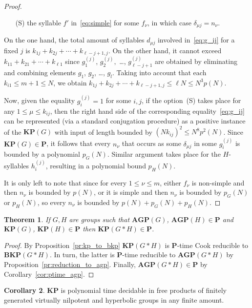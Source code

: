 \documentclass[10pt]{amsart}
\newtheorem{theorem}{Theorem}[section]
\theoremstyle{definition}
\newtheorem{corollary}[theorem]{Corollary}
\def\P{{\mathbf{P}}}
\def\BKP{{\mathbf{BKP}}}
\def\KP{{\mathbf{KP}}}
\def\AGP{{\mathbf{AGP}}}
\begin{document}
\begin{proof}
\begin{itemize}
\item[(S)]\label{li:simple} the syllable $f'$ in~\eqref{eq:simple} for some $f_\nu$, in which case $\delta_{\mu j}=n_\nu$.
\end{itemize}
On the one hand, the total amount of syllables $d_{\mu j}$ involved in~\eqref{eq:g_ij} for a fixed $j$ is $k_{1j}+k_{2j}+\cdots +k_{\ell-j+1,j}$. On the other hand, it cannot exceed $k_{11}+k_{21}+\cdots +k_{\ell 1}$
since $g_1^{(j)}$, $g_2^{(j)},$ \ldots, $g_{\ell-j+1}^{(j)}$ are obtained by eliminating and combining elements $g_1$, $g_2$, \ldots, $g_l$. Taking into account that each $k_{i1}\le m+1\le N$, we obtain $k_{1j}+k_{2j}+\cdots +k_{\ell-j+1,j}\le \ell N\le N^3p(N)$.



Now, given the equality $g_i^{(j)}=1$ for some $i,j$, if the option~(S) takes place for any $1\le \mu\le k_{ij}$, then the right hand side of the corresponding equality~\eqref{eq:g_ij} can be represented (via a standard conjugation procedure) as a positive instance of the $\KP(G)$ with input of length bounded by $(N k_{ij})^2\le N^8p^2(N)$. Since $\KP(G)\in\P$, it follows that every $n_\nu$ that occurs as some $\delta_{\mu j}$ in some $g_i^{(j)}$ is bounded by a polynomial $p_G(N)$. Similar argument takes place for the $H$-syllables $h_i^{(j)}$, resulting in a polynomial bound $p_H(N)$.

It is only left to note that since for every $1\le \nu\le m$, either $f_\nu$ is non-simple and then $n_\nu$ is bounded by $p(N)$, or it is simple and then $n_\nu$ is bounded by $p_G(N)$ or $p_H(N)$, so every $n_\nu$ is bounded by $p(N)+p_G(N)+p_H(N)$.
\end{proof}

\begin{theorem}\label{th:ptime_kp}
If $G,H$ are groups such that $\AGP(G)$, $\AGP(H)\in\P$ and $\KP(G)$, $\KP(H)\in\P$ then $\KP(G*H)\in\P$.
\end{theorem}
\begin{proof} By Proposition~\ref{pr:kp_to_bkp} $\KP(G*H)$ is $\P$-time Cook reducible to $\BKP(G*H)$. In turn, the latter is $\P$-time reducible to $\AGP(G*H)$ by Proposition~\ref{pr:reduction_to_agp}. Finally, $\AGP(G*H)\in\P$ by Corollary~\ref{cor:ptime_agp}.
\end{proof}
\begin{corollary}
$\KP$ is polynomial time decidable in free products of finitely generated virtually nilpotent and hyperbolic groups in any finite amount.
\end{corollary}

%

\end{document}
